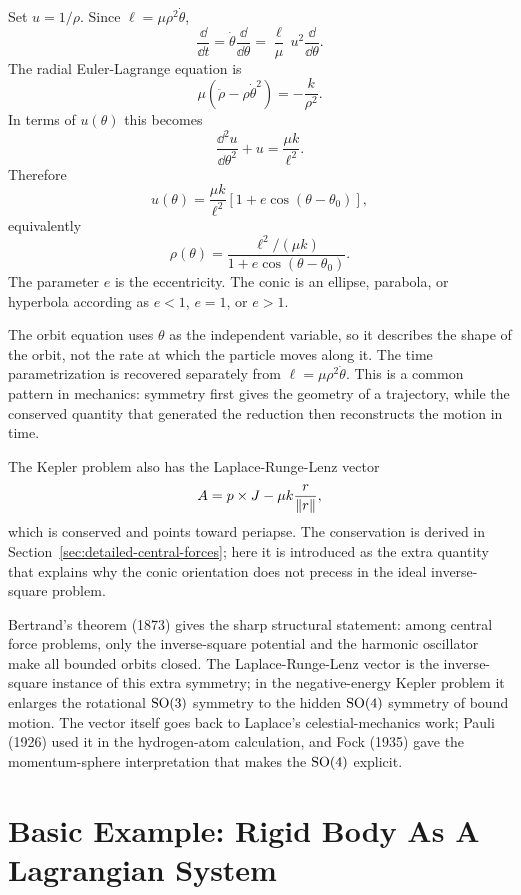 \begin{derivation}
Set \(u=1/\rho\). Since \(\ell=\mu\rho^2\dot\theta\),
\[
  \frac{\dd}{\dd t}=\dot\theta\frac{\dd}{\dd\theta}
  =
  \frac{\ell}{\mu}\,u^2\frac{\dd}{\dd\theta}.
\]
The radial Euler-Lagrange equation is
\[
  \mu(\ddot\rho-\rho\dot\theta^2)=-\frac{k}{\rho^2}.
\]
In terms of \(u(\theta)\) this becomes
\[
  \frac{\dd^2u}{\dd\theta^2}+u=\frac{\mu k}{\ell^2}.
\]
Therefore
\[
  u(\theta)=\frac{\mu k}{\ell^2}\left[1+e\cos(\theta-\theta_0)\right],
\]
equivalently
\[
  \boxed{
  \rho(\theta)=
  \frac{\ell^2/(\mu k)}{1+e\cos(\theta-\theta_0)}
  }.
\]
The parameter \(e\) is the eccentricity. The conic is an ellipse, parabola, or
hyperbola according as \(e<1\), \(e=1\), or \(e>1\).
\end{derivation}

The orbit equation uses \(\theta\) as the independent variable, so it describes
the shape of the orbit, not the rate at which the particle moves along it. The
time parametrization is recovered separately from
\(\ell=\mu\rho^2\dot\theta\).  This is a common pattern in mechanics:
symmetry first gives the geometry of a trajectory, while the conserved
quantity that generated the reduction then reconstructs the motion in time.

The Kepler problem also has the Laplace-Runge-Lenz vector
\[
  A=p\times J-\mu k\frac{r}{\left\lVert r\right\rVert},
\]
which is conserved and points toward periapse. The conservation is derived in
Section~\ref{sec:detailed-central-forces}; here it is introduced as the extra
quantity that explains why the conic orientation does not precess in the ideal
inverse-square problem.

\begin{remark}
Bertrand's theorem (1873) gives the sharp structural statement: among central
force problems, only the inverse-square potential and the harmonic oscillator
make all bounded orbits closed. The Laplace-Runge-Lenz vector is the
inverse-square instance of this extra symmetry; in the negative-energy Kepler
problem it enlarges the rotational \(\operatorname{SO}(3)\) symmetry to the hidden
\(\operatorname{SO}(4)\) symmetry of bound motion. The vector itself goes back to Laplace's
celestial-mechanics work; Pauli (1926) used it in the hydrogen-atom
calculation, and Fock (1935) gave the momentum-sphere interpretation that makes
the \(\operatorname{SO}(4)\) explicit.
\end{remark}

\section{Basic Example: Rigid Body As A Lagrangian System}
\label{sec:rigid-body-lagrangian}

